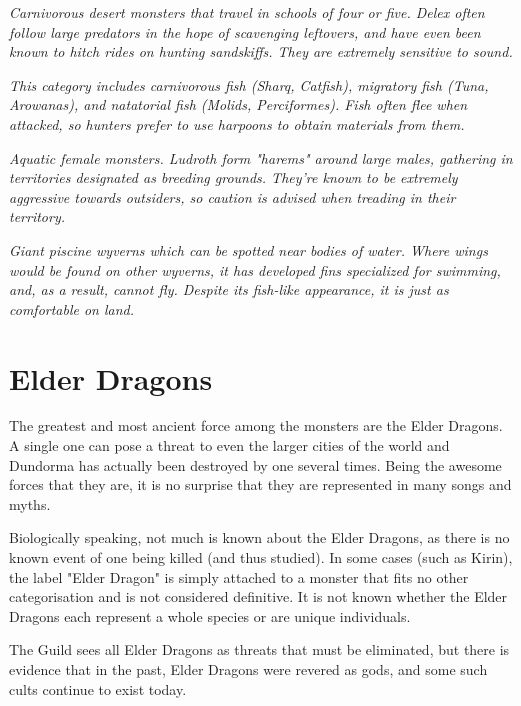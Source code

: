 \textit{Carnivorous desert monsters that travel in schools of four or five. Delex often follow large predators in the hope of scavenging leftovers, and have even been known to hitch rides on hunting sandskiffs. They are extremely sensitive to sound.}

\textit{This category includes carnivorous fish (Sharq, Catfish), migratory fish (Tuna, Arowanas), and natatorial fish (Molids, Perciformes). Fish often flee when attacked, so hunters prefer to use harpoons to obtain materials from them.}

\textit{Aquatic female monsters. Ludroth form "harems" around large males, gathering in territories designated as breeding grounds. They're known to be extremely aggressive towards outsiders, so caution is advised when treading in their territory.}

\textit{Giant piscine wyverns which can be spotted near bodies of water. Where wings would be found on other wyverns, it has developed fins specialized for swimming, and, as a result, cannot fly. Despite its fish-like appearance, it is just as comfortable on land.}

\section{Elder Dragons}
The greatest and most ancient force among the monsters are the Elder Dragons. A single one can pose a threat to even the larger cities of the world and Dundorma has actually been destroyed by one several times. Being the awesome forces that they are, it is no surprise that they are represented in many songs and myths.

Biologically speaking, not much is known about the Elder Dragons, as there is no known event of one being killed (and thus studied). In some cases (such as Kirin), the label "Elder Dragon" is simply attached to a monster that fits no other categorisation and is not considered definitive. It is not known whether the Elder Dragons each represent a whole species or are unique individuals.

The Guild sees all Elder Dragons as threats that must be eliminated, but there is evidence that in the past, Elder Dragons were revered as gods, and some such cults continue to exist today.

